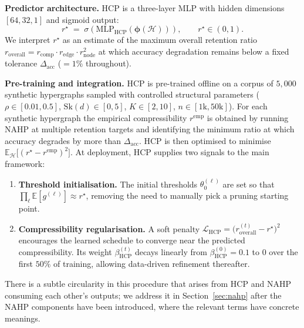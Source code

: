 \documentclass[10pt]{article}
\theoremstyle{plain}
\theoremstyle{definition}
\begin{document}
\textbf{Predictor architecture.} HCP is a three-layer MLP with hidden dimensions $[64,32,1]$ and sigmoid output:
\begin{equation}
r^\star \;=\; \sigma\!\left(\mathrm{MLP}_{\mathrm{HCP}}
                            (\boldsymbol{\phi}(\mathcal{H}))\right),
\qquad r^\star\in(0,1).
\label{eq:hcp_predictor}
\end{equation}
We interpret $r^\star$ as an estimate of the maximum overall retention ratio $r_{\mathrm{overall}} = r_{\mathrm{comp}}\cdot r_{\mathrm{edge}}\cdot r_{\mathrm{node}}^{2}$ at which accuracy degradation remains below a fixed tolerance $\Delta_{\mathrm{acc}}$ ($=1\%$ throughout).

\textbf{Pre-training and integration.} HCP is pre-trained offline on a corpus of $5{,}000$ synthetic hypergraphs sampled with controlled structural parameters ($\rho\in[0.01,0.5]$, $\mathrm{Sk}(d)\in[0,5]$, $K\in[2,10]$, $n\in[1\mathrm{k},50\mathrm{k}]$). For each synthetic hypergraph the empirical compressibility $r^{\mathrm{emp}}$ is obtained by running NAHP at multiple retention targets and identifying the minimum ratio at which accuracy degrades by more than $\Delta_{\mathrm{acc}}$. HCP is then optimised to minimise $\mathbb{E}_{\mathcal{H}}\!\big[(r^\star - r^{\mathrm{emp}})^2\big]$. At deployment, HCP supplies two signals to the main framework:
\begin{enumerate}\itemsep0pt
\item \textbf{Threshold initialisation.} The initial thresholds $\theta_0^{(\ell)}$ are set so that $\prod_{\ell}\mathbb{E}[g^{(\ell)}]\approx r^\star$, removing the need to manually pick a pruning starting point.
\item \textbf{Compressibility regularisation.} A soft penalty $\mathcal{L}_{\mathrm{HCP}} = \big(r_{\mathrm{overall}}^{(t)} - r^\star\big)^{2}$ encourages the learned schedule to converge near the predicted compressibility. Its weight $\beta_{\mathrm{HCP}}^{(t)}$ decays linearly from $\beta_{\mathrm{HCP}}^{(0)}=0.1$ to $0$ over the first $50\%$ of training, allowing data-driven refinement thereafter.
\end{enumerate}

There is a subtle circularity in this procedure that arises from HCP and NAHP consuming each other's outputs; we address it in Section~\ref{sec:nahp} after the NAHP components have been introduced, where the relevant terms have concrete meanings.
\end{document}
